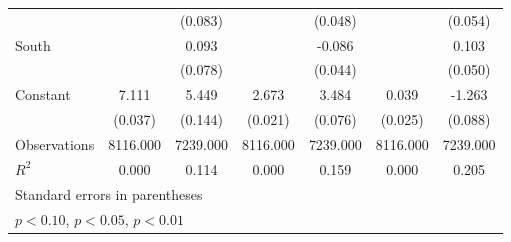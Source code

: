 {\begin{tabular}{l*{6}{c}}
                    &                     &     (0.083)         &                     &     (0.048)         &                     &     (0.054)         \\
\addlinespace
South               &                     &       0.093         &                     &      -0.086\sym{**} &                     &       0.103\sym{**} \\
                    &                     &     (0.078)         &                     &     (0.044)         &                     &     (0.050)         \\
\addlinespace
Constant            &       7.111\sym{***}&       5.449\sym{***}&       2.673\sym{***}&       3.484\sym{***}&       0.039         &      -1.263\sym{***}\\
                    &     (0.037)         &     (0.144)         &     (0.021)         &     (0.076)         &     (0.025)         &     (0.088)         \\
\midrule
Observations        &    8116.000         &    7239.000         &    8116.000         &    7239.000         &    8116.000         &    7239.000         \\
\(R^{2}\)           &       0.000         &       0.114         &       0.000         &       0.159         &       0.000         &       0.205         \\
\bottomrule
\multicolumn{7}{l}{\footnotesize Standard errors in parentheses}\\
\multicolumn{7}{l}{\footnotesize \sym{*} \(p<0.10\), \sym{**} \(p<0.05\), \sym{***} \(p<0.01\)}\\
\end{tabular}
}

